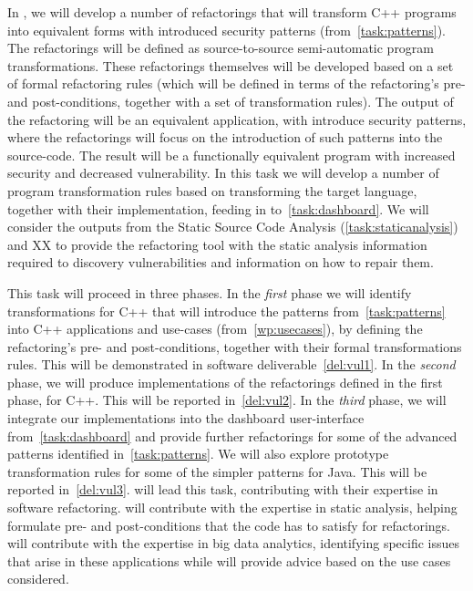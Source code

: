 \begin{Workpackage}{\thewpno}
\begin{Task}
In \theTask{}, we will develop a number of refactorings that will transform C++ programs into equivalent forms with introduced security patterns (from~\ref{task:patterns}). The refactorings will be defined as source-to-source semi-automatic program transformations. 
%
%
%
These refactorings themselves will be developed based on a set of formal refactoring rules (which will be defined in terms of the refactoring's pre- and post-conditions, together with a set of transformation rules). The output of the refactoring will be an equivalent application, with introduce security patterns, where the refactorings will focus on the introduction of such patterns into the source-code. The result will be a functionally equivalent program with increased security and decreased vulnerability. In this task we will develop a number of program transformation rules based on transforming the target language, together with their implementation, feeding in to~\ref{task:dashboard}. We will consider the outputs from the Static Source Code Analysis (\ref{task:staticanalysis})   and XX to provide the refactoring tool with the static analysis information required to discovery vulnerabilities and information on how to repair them.
%

This task will proceed in three phases. In the \emph{first} phase we will identify transformations for C++  that will introduce the patterns from~\ref{task:patterns} into C++ applications and use-cases (from~\ref{wp:usecases}), by defining the refactoring's  pre- and post-conditions, together with their formal transformations rules. This will be demonstrated in software deliverable~\ref{del:vul1}. In the \emph{second} phase, we will produce implementations of the refactorings defined in the first phase, for C++. This will be reported in~\ref{del:vul2}.
 In the \emph{third} phase, we will integrate our implementations into the dashboard user-interface from~\ref{task:dashboard} and provide further refactorings for some of the advanced patterns identified in~\ref{task:patterns}.
We will also explore prototype transformation rules for some of the simpler patterns for Java. This will be reported in~\ref{del:vul3}. \SAshort{} will lead this task, contributing with their expertise in software refactoring. \YAGshort{} will contribute with the expertise in static analysis, helping formulate pre- and post-conditions that the code has to satisfy for refactorings. \UODshort{} will contribute with the expertise in big data analytics, identifying specific issues that arise in these applications while \SOPRAshort{} will provide advice based on the use cases considered.


\end{Task}
\end{Workpackage}
